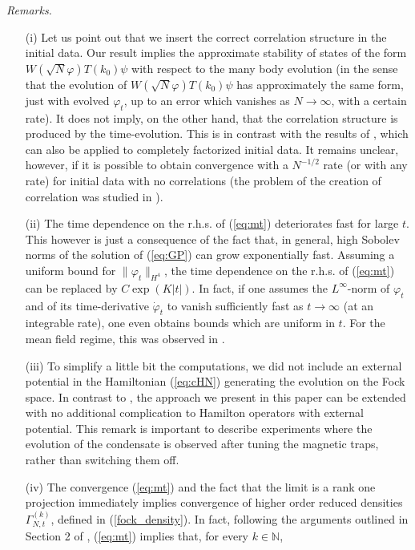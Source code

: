 \documentclass[11pt,a4paper]{article}
\newcommand{\bN}{{\mathbb N}}
\begin{document}
{\it Remarks.}
\begin{itemize}
\item[(i)] Let us point out that we insert the correct correlation structure in the initial data. Our result implies the approximate stability of states of the form $W(\sqrt{N} \varphi) T(k_0) \psi$ with respect to the many body evolution (in the sense that the evolution of $W(\sqrt{N} \varphi) T(k_0) \psi$ has approximately the same form, just with evolved $\varphi_t$, up to an error which vanishes as $N\to \infty$, with a certain rate). It does not imply, on the other hand, that the correlation structure is produced by the time-evolution. This is in contrast with the results of \cite{ESY1,ESY2,ESY3,ESY4}, which can also be applied to completely factorized initial data. It remains unclear, however, if it is possible to obtain convergence with a $N^{-1/2}$ rate (or with any rate) for initial data with 
no correlations (the problem of the creation of correlation was studied in \cite{EMS}). 
\item[(ii)] The time dependence on the r.h.s. of (\ref{eq:mt}) deteriorates fast for large $t$. This however is just a consequence of the fact that, in general, high Sobolev norms of the solution of (\ref{eq:GP}) can grow exponentially fast. Assuming a uniform bound for $\| \varphi_t \|_{H^4}$, the time dependence on the r.h.s. of (\ref{eq:mt}) can be replaced by $C \exp (K |t|)$. In fact, if one assumes the $L^\infty$-norm of $\varphi_t$ and of its time-derivative $\dot\varphi_t$ to vanish sufficiently fast as $t \to \infty$ (at an integrable rate), one even obtains bounds which are uniform in $t$. For the mean field regime, this was observed in \cite{KP2009}.
\item[(iii)] To simplify a little bit the computations, we did not include an external potential in the Hamiltonian (\ref{eq:cHN}) generating the evolution on the Fock space. In contrast to \cite{ESY1,ESY2,ESY3,ESY4}, the approach we present in this paper can be extended with no additional complication to Hamilton operators with external potential. This remark is important to describe experiments where the evolution of the condensate is observed after tuning the magnetic traps, rather than switching them off. 
\item[(iv)] The convergence (\ref{eq:mt}) and the fact that the limit is a rank one projection immediately implies convergence of higher order reduced densities $\Gamma_{N,t}^{(k)}$, defined in (\ref{fock_density}). In fact, following the arguments outlined in Section 2 of \cite{KP2009}, (\ref{eq:mt}) implies that, for every $k \in \bN$,

\end{itemize}
\end{document}
